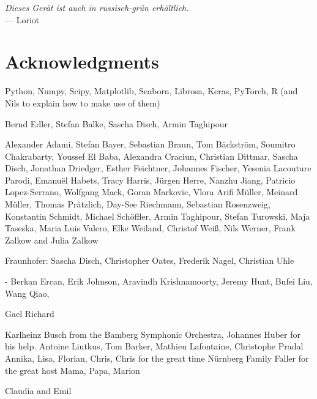 
\begin{flushright}{\slshape
    Dieses Gerät ist auch in russisch-grün erhältlich.
    }\\ \medskip
    --- Loriot
\end{flushright}



\bigskip

\begingroup
\let\clearpage\relax
\let\cleardoublepage\relax
\let\cleardoublepage\relax
\chapter*{Acknowledgments}

Python, Numpy, Scipy, Matplotlib, Seaborn, Librosa, Keras, PyTorch, R (and Nils to explain how to make use of them)

Bernd Edler, Stefan Balke, Sascha Disch, Armin Taghipour

Alexander Adami, Stefan Bayer, Sebastian Braun, Tom Bäckström, Soumitro Chakrabarty, 
Youssef El Baba, Alexandra Craciun, Christian Dittmar, Sascha Disch, Jonathan Driedger, Esther Feichtner, Johannes Fischer, 
Yesenia Lacouture Parodi, Emanuël Habets, Tracy Harris, Jürgen Herre, Nanzhu Jiang, 
Patricio Lopez-Serrano, Wolfgang Mack, Goran Markovic, Vlora Arifi Müller, Meinard Müller, Thomas Prätzlich, 
Day-See Riechmann, Sebastian Rosenzweig, Konstantin Schmidt, Michael Schöffler, Armin Taghipour, 
Stefan Turowski, Maja Taseska, Maria Luis Valero, Elke Weiland, Christof Weiß, Nils Werner, 
Frank Zalkow and Julia Zalkow

Fraunhofer: Sascha Disch, Christopher Oates, Frederik Nagel, Christian Uhle

- Berkan Ercan, Erik Johnson, Aravindh Krishnamoorty, Jeremy Hunt, Bufei Liu, Wang Qiao, 





Gael Richard
\bigskip

\bigskip
Karlheinz Busch from the Bamberg Symphonic Orchestra, Johannes Huber for his help.
\bigskip
Antoine Liutkus, Tom Barker, Mathieu Lafontaine, Christophe Pradal
\bigskip
Annika, Lisa, Florian, Chris, Chris for the great time Nürnberg
\bigskip
Family Faller for the great host
Mama, Papa, Marion

\bigskip

Claudia and Emil

\endgroup
